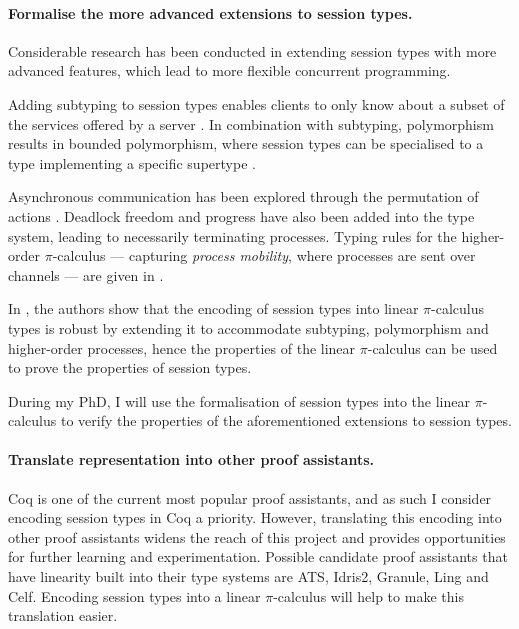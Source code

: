 \documentclass{mproj}
\newcommand{\picalc}{$\pi$-calculus}
\begin{document}
\paragraph{Formalise the more advanced extensions to session types.} \hfill

Considerable research has been conducted in extending session types with more advanced features, which lead to more flexible concurrent programming.

Adding subtyping to session types enables clients to only know about a subset of the services offered by a server \cite{Gay2005}. In combination with subtyping, polymorphism results in bounded polymorphism, where session types can be specialised to a type implementing a specific supertype \cite{Gay2008}.

Asynchronous communication has been explored through the permutation of actions \cite{Mostrous2009}. Deadlock freedom \cite{Kobayashi2002,Kobayashi2006} and progress \cite{Dezani-Ciancaglini2008} have also been added into the type system, leading to necessarily terminating processes. Typing rules for the higher-order \picalc{} ---  capturing \emph{process mobility}, where processes are sent over channels --- are given in \cite{Mostrous2007}.

In \cite{Dardha2017}, the authors show that the encoding of session types into linear \picalc{} types is robust by extending it to accommodate subtyping, polymorphism and higher-order processes, hence the properties of the linear \picalc{} can be used to prove the properties of session types.

During my PhD, I will use the formalisation of session types into the linear \picalc{} to verify the properties of the aforementioned extensions to session types.

\paragraph{Translate representation into other proof assistants.} \hfill

Coq is one of the current most popular proof assistants, and as such I consider encoding session types in Coq a priority.  However, translating this encoding into other proof assistants widens the reach of this project and provides opportunities for further learning and experimentation.  Possible candidate proof assistants that have linearity built into their type systems are ATS, Idris2, Granule, Ling and Celf. Encoding session types into a linear \picalc{} will help to make this translation easier.



\end{document}
